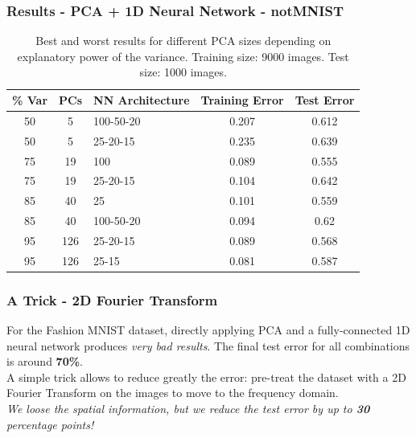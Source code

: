 \documentclass{beamer}
\begin{document}
\begin{frame}
\frametitle{Results - PCA + 1D Neural Network - notMNIST}
\begin{table}[hbt]
  \begin{tabular}{|cc|l|c|c|}
  	\hline
    \% Var & PCs & NN Architecture & Training Error & Test Error \\
    \hline
    \hline
    50 & 5 & 100-50-20 & 0.207    & 0.612\\
    50& 5 & 25-20-15 & 0.235    & 0.639\\
    \hline
    75 & 19 &  100 & 0.089    & 0.555\\
    75 & 19& 25-20-15 & 0.104    & 0.642\\
    \hline
    85 & 40 & 25 & 0.101   &  0.559\\
    85 & 40 & 100-50-20 & 0.094     & 0.62\\
    \hline
    95 & 126 & 25-20-15 & 0.089   &  0.568\\
    95 & 126 & 25-15 & 0.081   &  0.587\\
    \hline
  \end{tabular}
    \vspace{1em}
  \caption{Best and worst results for different PCA sizes depending on explanatory power of the variance. Training size: 9000 images. Test size: 1000 images.}
\end{table}
\end{frame}

\begin{frame}
\frametitle{A Trick - 2D Fourier Transform}
	For the Fashion MNIST dataset, directly applying PCA and a fully-connected 1D neural network produces \textit{very bad results}. The final test error for all combinations is around \textbf{70\%}. \\
	\vspace{1em}
	A simple trick allows to reduce greatly the error: pre-treat the dataset with a 2D Fourier Transform on the images to move to the frequency domain. \\
	\vspace{1em}
	\textit{We loose the spatial information, but we reduce the test error by up to \textbf{30} percentage points!}
\end{frame}
\end{document}
